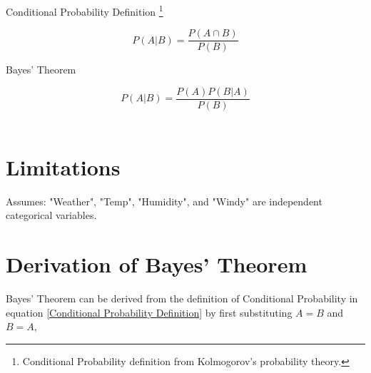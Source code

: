 \documentclass{article}
\begin{document}
%
%


\begin{center} Conditional Probability Definition \footnote{Conditional Probability definition from Kolmogorov's probability theory. } \end{center}

\begin{equation} \tag{1}
		\nonumber P \left( A | B \right) = \frac{ P  \left( A \cap B \right)}{P \left( B \right)}
		\label{Conditional Probability Definition}
\end{equation} 

%
%


\begin{center} Bayes' Theorem \end{center}

\begin{equation} \tag{2}
		\nonumber P \left( A | B \right) = \frac{ P  \left( A  \right) P \left( B | A \right)}{P \left( B \right)}
		\label{Bayes' Theorem}
\end{equation} \\

%
%

\section{Limitations}
Assumes: "Weather", "Temp", "Humidity", and "Windy" are independent categorical variables.



%
%

\section{Derivation of Bayes' Theorem }
Bayes' Theorem can be derived from the definition of Conditional Probability in  equation \ref{Conditional Probability Definition} by first substituting $A = B$ and $B = A$,

\end{document}
